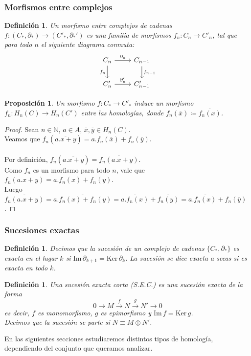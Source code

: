 \documentclass[12pt,a4paper]{article}
\newtheorem{proposition}[theorem]{Proposición}
\newtheorem{definition}[theorem]{Definición}
\begin{document}
\subsubsection{Morfismos entre complejos}
\begin{definition}    
Un \textit{morfismo entre complejos de cadenas} $f: (C_*, \partial_*) \rightarrow (C'_*, \partial_*')$ es una familia de morfismos $f_n: C_n \rightarrow C'_n$, tal que para todo $n$ el siguiente diagrama conmuta:
\[
\begin{tikzcd}
C_n \arrow[r, "{\partial_n}"] \arrow[d, "f_n"'] & C_{n-1} \arrow[d, "f_{n-1}"] \\
C'_n \arrow[r, "{\partial'_n}"] & C'_{n-1}
\end{tikzcd}
\]
\end{definition}
\begin{proposition}
Un morfismo $f: C_* \rightarrow C'_*$ induce un morfismo $f_n: H_n(C) \rightarrow H_n(C')$ entre las homologías, donde $f_n(\overline{x}) \coloneqq \overline{f_n(x)}$.
\end{proposition}
\begin{proof}
Sean $n \in \mathbb{N}$, $a \in A$, $\overline{x}, \overline{y} \in H_n(C)$.
\\
Veamos que $f_n(\overline{a.x + y}) = a.f_n(\overline{x}) + f_n(\overline{y})$.
\\
\\
Por definición, $f_n(\overline{a.x+y}) = \overline{f_n(a.x+y)}$.
\\
Como $f_n$ es un morfismo para todo $n$, vale que $f_n(a.x+y) = a.f_n(x) + f_n(y)$.
\\
Luego $\overline{f_n(a.x+y)} = \overline{a.f_n(x) + f_n(y)} = \overline{a.f_n(x)} + \overline{f_n(y)} = a.\overline{f_n(x)} + f_n(\overline{y})$.
\end{proof}
\subsubsection{Sucesiones exactas}
\begin{definition}
Decimos que la sucesión de un complejo de cadenas $\{C_*, \partial_*\}$ es exacta en el lugar $k$ si $\text{Im} \,\partial_{k+1} = \text{Ker} \, \partial_k$. La sucesión se dice exacta a secas si es exacta en todo $k$.
\end{definition}
\begin{definition}    
Una sucesión exacta corta (S.E.C.) es una sucesión exacta de la forma
\[
0 \rightarrow M \xrightarrow{f} N \xrightarrow{g} N' \rightarrow 0
\]
es decir, $f$ es monomorfismo, $g$ es epimorfismo y $\text{Im} \, f = \text{Ker} \, g$.
\\
Decimos que la sucesión \textit{se parte} si $N \equiv M \oplus N'$.
\end{definition}
En las siguientes secciones estudiaremos distintos tipos de homología, dependiendo del conjunto que queramos analizar.
\end{document}
